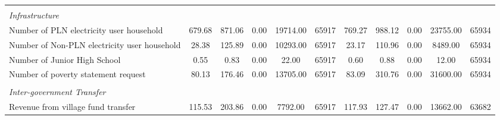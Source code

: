 \begin{tabular}{l*{2}{ccccc}}
\vspace{0.05em} \\ \emph{Infrastructure}&         &         &         &         &         &         &         &         &         &         \\
\hspace{0.25cm} Number of PLN electricity user household&   679.68&   871.06&     0.00& 19714.00&    65917&   769.27&   988.12&     0.00& 23755.00&    65934\\
\hspace{0.25cm} Number of Non-PLN electricity user household&    28.38&   125.89&     0.00& 10293.00&    65917&    23.17&   110.96&     0.00&  8489.00&    65934\\
\hspace{0.25cm} Number of Junior High School&     0.55&     0.83&     0.00&    22.00&    65917&     0.60&     0.88&     0.00&    12.00&    65934\\
\hspace{0.25cm} Number of poverty statement request&    80.13&   176.46&     0.00& 13705.00&    65917&    83.09&   310.76&     0.00& 31600.00&    65934\\
\vspace{0.05em} \\ \emph{Inter-government Transfer}&         &         &         &         &         &         &         &         &         &         \\
\hspace{0.25cm} Revenue from village fund transfer&   115.53&   203.86&     0.00&  7792.00&    65917&   117.93&   127.47&     0.00& 13662.00&    63682\\
\bottomrule
\end{tabular}
